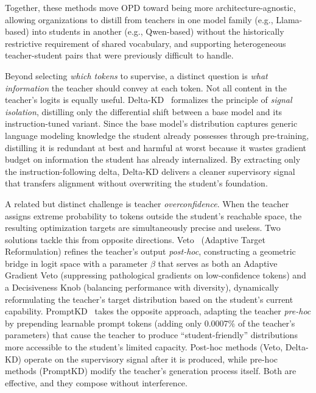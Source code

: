 \documentclass{article} %
\begin{document}
Together, these methods move OPD toward being more architecture-agnostic, allowing organizations to distill from teachers in one model family (e.g., Llama-based) into students in another (e.g., Qwen-based) without the historically restrictive requirement of shared vocabulary, and supporting heterogeneous teacher-student pairs that were previously difficult to handle.

Beyond selecting \emph{which tokens} to supervise, a distinct question is \emph{what information} the teacher should convey at each token. Not all content in the teacher's logits is equally useful. Delta-KD~\citep{2509.14526} formalizes the principle of \emph{signal isolation}, distilling only the differential shift between a base model and its instruction-tuned variant. Since the base model's distribution captures generic language modeling knowledge the student already possesses through pre-training, distilling it is redundant at best and harmful at worst because it wastes gradient budget on information the student has already internalized. By extracting only the instruction-following delta, Delta-KD delivers a cleaner supervisory signal that transfers alignment without overwriting the student's foundation.

A related but distinct challenge is teacher \emph{overconfidence}. When the teacher assigns extreme probability to tokens outside the student's reachable space, the resulting optimization targets are simultaneously precise and useless. Two solutions tackle this from opposite directions. Veto~\citep{2601.07155} (Adaptive Target Reformulation) refines the teacher's output \emph{post-hoc}, constructing a geometric bridge in logit space with a parameter $\beta$ that serves as both an Adaptive Gradient Veto (suppressing pathological gradients on low-confidence tokens) and a Decisiveness Knob (balancing performance with diversity), dynamically reformulating the teacher's target distribution based on the student's current capability. PromptKD~\citep{2402.12842} takes the opposite approach, adapting the teacher \emph{pre-hoc} by prepending learnable prompt tokens (adding only 0.0007\% of the teacher's parameters) that cause the teacher to produce ``student-friendly'' distributions more accessible to the student's limited capacity. Post-hoc methods (Veto, Delta-KD) operate on the supervisory signal after it is produced, while pre-hoc methods (PromptKD) modify the teacher's generation process itself. Both are effective, and they compose without interference.
\end{document}
